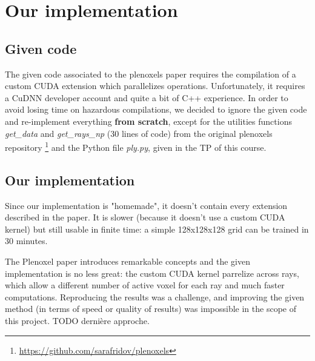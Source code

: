 \documentclass{article}
\begin{document}
\section{Our implementation}

\subsection{Given code}


The given code associated to the plenoxels paper requires the compilation of a custom CUDA extension which parallelizes operations. Unfortunately, it requires a CuDNN developer account and quite a bit of C++ experience. In order to avoid losing time on hazardous compilations, we decided to ignore the given code and re-implement everything \textbf{from scratch}, except for the utilities functions \textit{get\_data} and \textit{get\_rays\_np} (30 lines of code) from the original plenoxels repository \footnote{\url{https://github.com/sarafridov/plenoxels}} and the Python file \textit{ply.py}, given in the TP of this course.  

\subsection{Our implementation}


Since our implementation is "homemade", it doesn't contain every extension described in the paper. It is slower (because it doesn't use a custom CUDA kernel) but still usable in finite time: a simple 128x128x128 grid can be trained in 30 minutes. 


The Plenoxel paper introduces remarkable concepts and the given implementation is no less great: the custom CUDA kernel parrelize across rays, which allow a different number of active voxel for each ray and much faster computations. Reproducing the results was a challenge, and improving the given method (in terms of speed or quality of results) was impossible in the scope of this project. TODO dernière approche.
\end{document}
